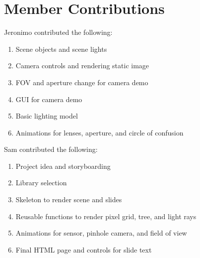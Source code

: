 \documentclass{acm_proc_article-sp}
\begin{document}
\bigskip
\bigskip
\bigskip

\section{Member Contributions}

Jeronimo contributed the following:

\begin{enumerate}
  \item Scene objects and scene lights
  \item Camera controls and rendering static image
  \item FOV and aperture change for camera demo
  \item GUI for camera demo
  \item Basic lighting model
  \item Animations for lenses, aperture, and circle of confusion
\end{enumerate}

Sam contributed the following:

\begin{enumerate}
  \item Project idea and storyboarding
  \item Library selection
  \item Skeleton to render scene and slides
  \item Reusable functions to render pixel grid, tree, and light rays
  \item Animations for sensor, pinhole camera, and field of view
  \item Final HTML page and controls for slide text
\end{enumerate}





\end{document}
